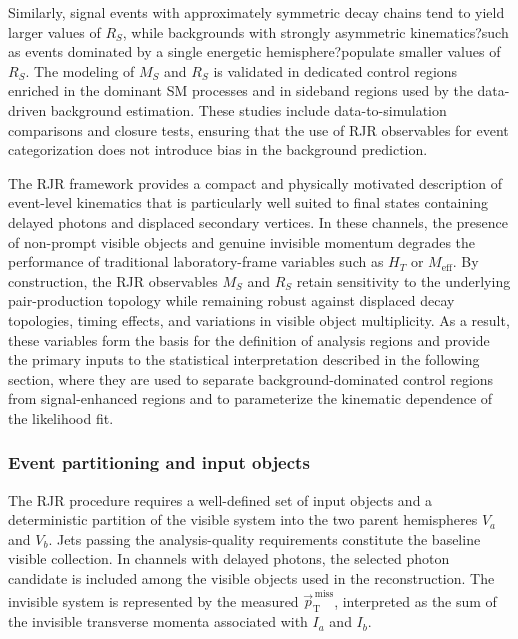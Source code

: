 Similarly, signal events with approximately symmetric decay chains tend to yield larger values of $R_S$, while backgrounds with strongly asymmetric kinematics?such as events dominated by a single energetic hemisphere?populate smaller values of $R_S$. The modeling of $M_S$ and $R_S$ is validated in dedicated control regions enriched in the dominant SM processes and in sideband regions used by the data-driven background estimation. These studies include data-to-simulation comparisons and closure tests, ensuring that the use of RJR observables for event categorization does not introduce bias in the background prediction.


The RJR framework provides a compact and physically motivated description of event-level kinematics that is particularly well suited to final states containing delayed photons and displaced secondary vertices. In these channels, the presence of non-prompt visible objects and genuine invisible momentum degrades the performance of traditional laboratory-frame variables such as $H_T$ or $M_{\mathrm{eff}}$. By construction, the RJR observables $M_S$ and $R_S$ retain sensitivity to the underlying pair-production topology while remaining robust against displaced decay topologies, timing effects, and variations in visible object multiplicity. As a result, these variables form the basis for the definition of analysis regions and provide the primary inputs to the statistical interpretation described in the following section, where they are used to separate background-dominated control regions from signal-enhanced regions and to parameterize the kinematic dependence of the likelihood fit.




\subsubsection{Event partitioning and input objects}
\label{sec:rjr_inputs}

The RJR procedure requires a well-defined set of input objects and a deterministic partition of the visible system into the two parent hemispheres $V_a$ and $V_b$. Jets passing the analysis-quality requirements constitute the baseline visible collection. In channels with delayed photons, the selected photon candidate is included among the visible objects used in the reconstruction. The invisible system is represented by the measured $\vec{p}_{\mathrm{T}}^{\,\text{miss}}$, interpreted as the sum of the invisible transverse momenta associated with $I_a$ and $I_b$.

